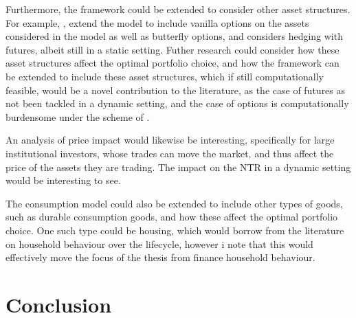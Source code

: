 \documentclass[11pt]{article}
\begin{document}
Furthermore, the framework could be extended to consider other asset structures.
For example, \autocite{CaiJuddXu2020}, extend the model to include vanilla options on the assets considered in the model as well as butterfly options,
and \autocite{Dybvig2020} considers hedging with futures, albeit still in a static setting.
Futher research could consider how these asset structures affect the optimal portfolio choice, and how the framework can be extended to include these asset structures,
which if still computationally feasible, would be a novel contribution to the literature, as the case of futures as not been tackled in a dynamic setting,
and the case of options is computationally burdensome under the scheme of \autocite{CaiJuddXu2020}.

An analysis of price impact would likewise be interesting, specifically for large institutional investors,
whose trades can move the market, and thus affect the price of the assets they are trading. The impact on the \ac{NTR} in a dynamic setting would be interesting to see.

The consumption model could also be extended to include other types of goods, such as durable consumption goods, and how these affect the optimal portfolio choice.
One such type could be housing, which would borrow from the literature on household behaviour over the lifecycle, however i note that this would effectively move the focus of the thesis from finance household behaviour.


\section{Conclusion} \label{Section: Conclusion}


\ifdefined\COMPILINGMAIN
\else
\end{document}
